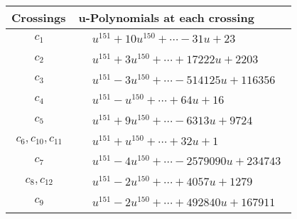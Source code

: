 \documentclass[1p]{elsarticle_modified}
\theoremstyle{definition}
\begin{document}
\begin{tabular}{m{50pt}|m{274pt}}
Crossings & \hspace{64pt}u-Polynomials at each crossing \\
\hline $$\begin{aligned}c_{1}\end{aligned}$$&$\begin{aligned}
&u^{151}+10 u^{150}+\cdots-31 u+23
\end{aligned}$\\
\hline $$\begin{aligned}c_{2}\end{aligned}$$&$\begin{aligned}
&u^{151}+3 u^{150}+\cdots+17222 u+2203
\end{aligned}$\\
\hline $$\begin{aligned}c_{3}\end{aligned}$$&$\begin{aligned}
&u^{151}-3 u^{150}+\cdots-514125 u+116356
\end{aligned}$\\
\hline $$\begin{aligned}c_{4}\end{aligned}$$&$\begin{aligned}
&u^{151}- u^{150}+\cdots+64 u+16
\end{aligned}$\\
\hline $$\begin{aligned}c_{5}\end{aligned}$$&$\begin{aligned}
&u^{151}+9 u^{150}+\cdots-6313 u+9724
\end{aligned}$\\
\hline $$\begin{aligned}c_{6},c_{10},c_{11}\end{aligned}$$&$\begin{aligned}
&u^{151}+u^{150}+\cdots+32 u+1
\end{aligned}$\\
\hline $$\begin{aligned}c_{7}\end{aligned}$$&$\begin{aligned}
&u^{151}-4 u^{150}+\cdots-2579090 u+234743
\end{aligned}$\\
\hline $$\begin{aligned}c_{8},c_{12}\end{aligned}$$&$\begin{aligned}
&u^{151}-2 u^{150}+\cdots+4057 u+1279
\end{aligned}$\\
\hline $$\begin{aligned}c_{9}\end{aligned}$$&$\begin{aligned}
&u^{151}-2 u^{150}+\cdots+492840 u+167911
\end{aligned}$\\
\hline
\end{tabular}\\~\\
\end{document}
